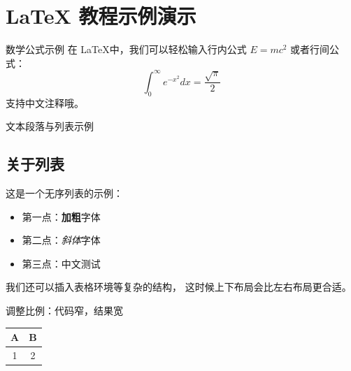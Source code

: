 \documentclass[UTF8]{ctexart}
\begin{document}
	
	\section*{LaTeX 教程示例演示}
	
	\begin{code-left}{数学公式示例}
在 \LaTeX 中，我们可以轻松输入行内公式
$E=mc^2$ 或者行间公式：
\[
\int_{0}^{\infty} e^{-x^2} dx = \frac{\sqrt{\pi}}{2}
\]
支持中文注释哦。
	\end{code-left}
	
	\vspace{1cm}
	
	\begin{code-top}{文本段落与列表示例}
		\subsection*{关于列表}
		这是一个无序列表的示例：
		\begin{itemize}
			\item 第一点：\textbf{加粗}字体
			\item 第二点：\textit{斜体}字体
			\item 第三点：中文测试
		\end{itemize}
		
		我们还可以插入表格环境等复杂的结构，
		这时候上下布局会比左右布局更合适。
	\end{code-top}
	
	\vspace{1cm}
	\begin{code-left}[lefthand width=0.4\textwidth]{调整比例：代码窄，结果宽}
		\begin{tabular}{|c|c|}
			\hline
			A & B \\
			\hline
			1 & 2 \\
			\hline
		\end{tabular}
	\end{code-left}
	
\end{document}
